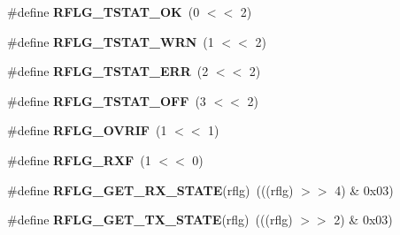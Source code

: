 \begin{DoxyCompactItemize}
\item 
\mbox{\label{group__RTEMSBSPsPowerPCGen5200MSCAN_gad69937e37ca7609515c634c738e025d1}} 
\#define {\bfseries R\+F\+L\+G\+\_\+\+T\+S\+T\+A\+T\+\_\+\+OK}~(0 $<$$<$ 2)
\item 
\mbox{\label{group__RTEMSBSPsPowerPCGen5200MSCAN_gaf626cfd4807618e710b7939e38eabdd4}} 
\#define {\bfseries R\+F\+L\+G\+\_\+\+T\+S\+T\+A\+T\+\_\+\+W\+RN}~(1 $<$$<$ 2)
\item 
\mbox{\label{group__RTEMSBSPsPowerPCGen5200MSCAN_ga3172a683d5135ea29189ad9d39a319a9}} 
\#define {\bfseries R\+F\+L\+G\+\_\+\+T\+S\+T\+A\+T\+\_\+\+E\+RR}~(2 $<$$<$ 2)
\item 
\mbox{\label{group__RTEMSBSPsPowerPCGen5200MSCAN_gac469a7a033c334127d71e25f8422fdf8}} 
\#define {\bfseries R\+F\+L\+G\+\_\+\+T\+S\+T\+A\+T\+\_\+\+O\+FF}~(3 $<$$<$ 2)
\item 
\mbox{\label{group__RTEMSBSPsPowerPCGen5200MSCAN_gae6b0837ff70266b37036ed90ce814fdd}} 
\#define {\bfseries R\+F\+L\+G\+\_\+\+O\+V\+R\+IF}~(1 $<$$<$ 1)
\item 
\mbox{\label{group__RTEMSBSPsPowerPCGen5200MSCAN_gad5d009d0db7fe1052d5f47f3ff2bae89}} 
\#define {\bfseries R\+F\+L\+G\+\_\+\+R\+XF}~(1 $<$$<$ 0)
\item 
\mbox{\label{group__RTEMSBSPsPowerPCGen5200MSCAN_ga1942e3deedc625e88df63680e3a2a2f8}} 
\#define {\bfseries R\+F\+L\+G\+\_\+\+G\+E\+T\+\_\+\+R\+X\+\_\+\+S\+T\+A\+TE}(rflg)~(((rflg) $>$$>$ 4) \& 0x03)
\item 
\mbox{\label{group__RTEMSBSPsPowerPCGen5200MSCAN_ga91eaf0ee584fc0e6389748e5ecee39c6}} 
\#define {\bfseries R\+F\+L\+G\+\_\+\+G\+E\+T\+\_\+\+T\+X\+\_\+\+S\+T\+A\+TE}(rflg)~(((rflg) $>$$>$ 2) \& 0x03)
\end{DoxyCompactItemize}
